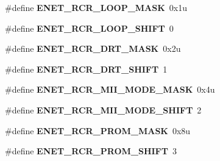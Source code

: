 \begin{DoxyCompactItemize}
\item 
\#define {\bfseries E\+N\+E\+T\+\_\+\+R\+C\+R\+\_\+\+L\+O\+O\+P\+\_\+\+M\+A\+SK}~0x1u\hypertarget{group__ENET__Register__Masks_ga0d93b88f79d8bdd51bb415a1ff84dd65}{}\label{group__ENET__Register__Masks_ga0d93b88f79d8bdd51bb415a1ff84dd65}

\item 
\#define {\bfseries E\+N\+E\+T\+\_\+\+R\+C\+R\+\_\+\+L\+O\+O\+P\+\_\+\+S\+H\+I\+FT}~0\hypertarget{group__ENET__Register__Masks_ga282373d2872e9226759336d35bb56c0a}{}\label{group__ENET__Register__Masks_ga282373d2872e9226759336d35bb56c0a}

\item 
\#define {\bfseries E\+N\+E\+T\+\_\+\+R\+C\+R\+\_\+\+D\+R\+T\+\_\+\+M\+A\+SK}~0x2u\hypertarget{group__ENET__Register__Masks_ga58442922cdcafe3b6d538552b38f4899}{}\label{group__ENET__Register__Masks_ga58442922cdcafe3b6d538552b38f4899}

\item 
\#define {\bfseries E\+N\+E\+T\+\_\+\+R\+C\+R\+\_\+\+D\+R\+T\+\_\+\+S\+H\+I\+FT}~1\hypertarget{group__ENET__Register__Masks_ga6fd2d01580d2b9cbe640d0af201ea723}{}\label{group__ENET__Register__Masks_ga6fd2d01580d2b9cbe640d0af201ea723}

\item 
\#define {\bfseries E\+N\+E\+T\+\_\+\+R\+C\+R\+\_\+\+M\+I\+I\+\_\+\+M\+O\+D\+E\+\_\+\+M\+A\+SK}~0x4u\hypertarget{group__ENET__Register__Masks_ga117cf78ff620b783e4dc4156ad1a735b}{}\label{group__ENET__Register__Masks_ga117cf78ff620b783e4dc4156ad1a735b}

\item 
\#define {\bfseries E\+N\+E\+T\+\_\+\+R\+C\+R\+\_\+\+M\+I\+I\+\_\+\+M\+O\+D\+E\+\_\+\+S\+H\+I\+FT}~2\hypertarget{group__ENET__Register__Masks_gaef1228d5d365350c81bf4bf641ad3dd4}{}\label{group__ENET__Register__Masks_gaef1228d5d365350c81bf4bf641ad3dd4}

\item 
\#define {\bfseries E\+N\+E\+T\+\_\+\+R\+C\+R\+\_\+\+P\+R\+O\+M\+\_\+\+M\+A\+SK}~0x8u\hypertarget{group__ENET__Register__Masks_gac7ad0640855d497207c29e8558341616}{}\label{group__ENET__Register__Masks_gac7ad0640855d497207c29e8558341616}

\item 
\#define {\bfseries E\+N\+E\+T\+\_\+\+R\+C\+R\+\_\+\+P\+R\+O\+M\+\_\+\+S\+H\+I\+FT}~3\hypertarget{group__ENET__Register__Masks_gabd47b61ac9aecad49dd266ff3421b98f}{}\label{group__ENET__Register__Masks_gabd47b61ac9aecad49dd266ff3421b98f}


\end{DoxyCompactItemize}
